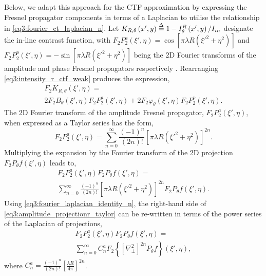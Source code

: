 \documentclass[twocolumn, switch]{article} %
\begin{document}
Below, we adapt this approach for the CTF approximation by expressing the Fresnel propagator components in terms of a Laplacian to utilise the relationship in \cref{eq3:fourier_ct_laplacian_n}.
Let ${K_{R,\theta }}\left( {x',y} \right) \buildrel \Delta \over = 1 - I_\theta ^R\left( {x',y} \right)/{I_{in}}$ designate the in-line contrast function, with ${F_2}P_2^a\left( {\xi ',\eta } \right) = \cos \left[ {\pi \lambda R\left( {{{\xi '}^2} + {\eta ^2}} \right)} \right]$ and ${F_2}P_2^p\left( {\xi ',\eta } \right) =  - \sin \left[ {\pi \lambda R\left( {{{\xi '}^2} + {\eta ^2}} \right)} \right]$  being the 2D Fourier transforms of the amplitude and phase Fresnel propagators respectively \cite{Nesterets2016PartiallyApproximation}. Rearranging \cref{eq3:intensity_r_ctf_weak} produces the expression,
\begin{multline}
    \label{eq3:ctf_contrast}
    {F_2}{K_{R,\theta }}\left( {\xi ',\eta } \right) =\\
    2{F_2}{B_\theta }\left( {\xi ',\eta } \right){F_2}P_2^a\left( {\xi ',\eta } \right) + 
    2{F_2}{\varphi _\theta }\left( {\xi ',\eta } \right){F_2}P_2^p\left( {\xi ',\eta } \right).
\end{multline}
The 2D Fourier transform of the amplitude Fresnel propagator, ${F_2}P_2^a\left( {\xi ',\eta } \right)$, when expressed as a Taylor series has the form,
\begin{equation}
    \label{eq3:amplitude_propagator_taylor}
    {F_2}P_2^a\left( {\xi ',\eta } \right) = \sum\limits_{n = 0}^\infty  {\frac{{{{\left( { - 1} \right)}^n}}}{{\left( {2n} \right)!}}} {\left[ {\pi \lambda R\left( {{{\xi '}^2} + {\eta ^2}} \right)} \right]^{2n}}.
\end{equation}
Multiplying the expansion by the Fourier transform of the 2D projection ${F_2}{P_\theta }f\left( {\xi ',\eta } \right)$ leads to, 
\begin{multline}
    \label{eq3:amplitude_projectionr_taylor}
    {F_2}P_2^a\left( {\xi ',\eta } \right){F_2}{P_\theta }f\left( {\xi ',\eta } \right) = \\
    \sum\limits_{n = 0}^\infty  {\frac{{{{\left( { - 1} \right)}^n}}}{{\left( {2n} \right)!}}} {\left[ {\pi \lambda R\left( {{{\xi '}^2} + {\eta ^2}} \right)} \right]^{2n}}{F_2}{P_\theta }f\left( {\xi ',\eta } \right).
\end{multline}
Using \cref{eq3:fourier_laplacian_identity_n}, the right-hand side of \cref{eq3:amplitude_projectionr_taylor} can be re-written in terms of the power series of the Laplacian of projections, 
\begin{multline}
    \label{eq3:amplitude_propagator_laplacian_n}
    {F_2}P_2^a\left( {\xi ',\eta } \right){F_2}{P_\theta }f\left( {\xi ',\eta } \right) = \\\sum\limits_{n = 0}^\infty  {C_n^a{F_2}\left\{ {{{\left[ {\nabla _ \bot ^2} \right]}^{2n}}{P_\theta }f} \right\}\left( {\xi ',\eta } \right)} ,
\end{multline}
where $C_n^a = \frac{{{{\left( { - 1} \right)}^n}}}{{\left( {2n} \right)!}}{\left[ {\frac{{\lambda R}}{{4\pi }}} \right]^{2n}}$.
\end{document}
